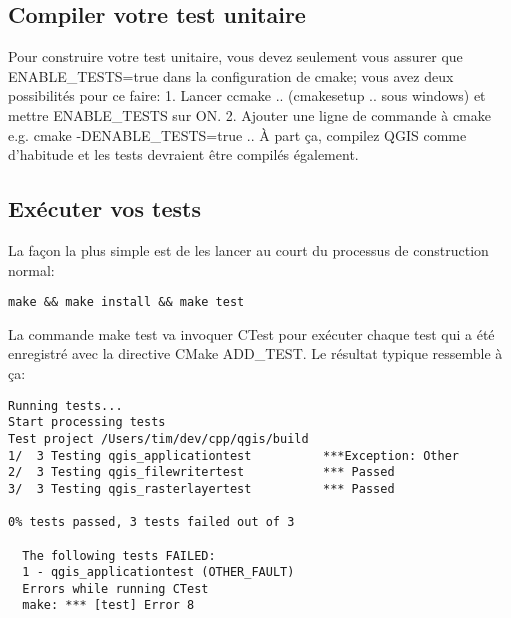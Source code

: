 \subsection{Compiler votre test unitaire}
Pour construire votre test unitaire, vous devez seulement vous assurer que ENABLE\_TESTS=true dans la configuration de cmake; vous avez deux possibilit\'es pour ce faire:
 1. Lancer ccmake .. (cmakesetup .. sous windows) et mettre ENABLE\_TESTS sur ON.
 2. Ajouter une ligne de commande \`a cmake e.g. cmake -DENABLE\_TESTS=true ..
\`A part \c{c}a, compilez QGIS comme d'habitude et les tests devraient \^etre compil\'es \'egalement.

\subsection{Ex\'ecuter vos tests}
La fa\c{c}on la plus simple est de les lancer au court du processus de construction normal:

\begin{verbatim}
make && make install && make test
\end{verbatim}

La commande make test va invoquer CTest pour ex\'ecuter chaque test qui a \'et\'e enregistr\'e avec la directive CMake ADD\_TEST. Le r\'esultat typique ressemble \`a \c{c}a:

\begin{verbatim}
Running tests...
Start processing tests
Test project /Users/tim/dev/cpp/qgis/build
1/  3 Testing qgis_applicationtest          ***Exception: Other
2/  3 Testing qgis_filewritertest           *** Passed
3/  3 Testing qgis_rasterlayertest          *** Passed

0% tests passed, 3 tests failed out of 3

  The following tests FAILED:
  1 - qgis_applicationtest (OTHER_FAULT)
  Errors while running CTest
  make: *** [test] Error 8
\end{verbatim}

